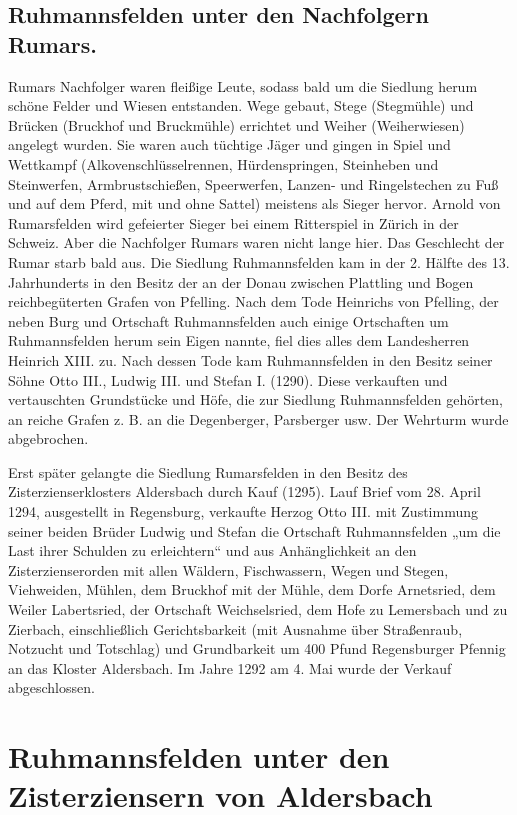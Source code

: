 \documentclass[12pt,a4paper]{book}
\begin{document}
\section{Ruhmannsfelden unter den Nachfolgern Rumars.}

Rumars Nachfolger waren fleißige Leute, sodass bald um die Siedlung
herum schöne Felder und Wiesen entstanden. Wege gebaut, Stege
(Stegmühle) und Brücken (Bruckhof und Bruckmühle) errichtet und Weiher
(Weiherwiesen) angelegt wurden. Sie waren auch tüchtige Jäger und gingen
in Spiel und Wettkampf (Alkovenschlüsselrennen, Hürdenspringen,
Steinheben und Steinwerfen, Armbrustschießen, Speerwerfen, Lanzen- und
Ringelstechen zu Fuß und auf dem Pferd, mit und ohne Sattel) meistens
als Sieger hervor. Arnold von Rumarsfelden wird gefeierter Sieger bei
einem Ritterspiel in Zürich in der Schweiz. Aber die Nachfolger Rumars
waren nicht lange hier. Das Geschlecht der Rumar starb bald aus. Die
Siedlung Ruhmannsfelden kam in der 2. Hälfte des 13. Jahrhunderts in den
Besitz der an der Donau zwischen Plattling und Bogen reichbegüterten
Grafen von Pfelling. Nach dem Tode Heinrichs von Pfelling, der neben
Burg und Ortschaft Ruhmannsfelden auch einige Ortschaften um
Ruhmannsfelden herum sein Eigen nannte, fiel dies alles dem Landesherren
Heinrich XIII. zu. Nach dessen Tode kam Ruhmannsfelden in den Besitz
seiner Söhne Otto III., Ludwig III. und Stefan I. (1290). Diese
verkauften und vertauschten Grundstücke und Höfe, die zur Siedlung
Ruhmannsfelden gehörten, an reiche Grafen z. B. an die Degenberger,
Parsberger usw. Der Wehrturm wurde abgebrochen.

Erst später gelangte die Siedlung Rumarsfelden in den Besitz des
Zisterzienserklosters Aldersbach durch Kauf (1295). Lauf Brief vom 28.
April 1294, ausgestellt in Regensburg, verkaufte Herzog Otto III. mit
Zustimmung seiner beiden Brüder Ludwig und Stefan die Ortschaft
Ruhmannsfelden „um die Last ihrer Schulden zu erleichtern“ und aus
Anhänglichkeit an den Zisterzienserorden mit allen Wäldern,
Fischwassern, Wegen und Stegen, Viehweiden, Mühlen, dem Bruckhof mit der
Mühle, dem Dorfe Arnetsried, dem Weiler Labertsried, der Ortschaft
Weichselsried, dem Hofe zu Lemersbach und zu Zierbach, einschließlich
Gerichtsbarkeit (mit Ausnahme über Straßenraub, Notzucht und Totschlag)
und Grundbarkeit um 400 Pfund Regensburger Pfennig an das Kloster
Aldersbach. Im Jahre 1292 am 4. Mai wurde der Verkauf abgeschlossen.

\chapter{Ruhmannsfelden unter den Zisterziensern von Aldersbach}
\end{document}
